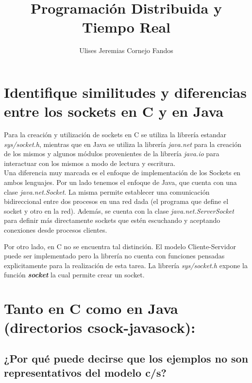 \documentclass[osajnl,twocolumn,showpacs,superscriptaddress,10pt]{revtex4-1} %
\begin{document}
\title{Programación Distribuida y Tiempo Real}

\author{Ulises Jeremias Cornejo Fandos}

\maketitle %

\section{Identifique similitudes y diferencias entre los sockets en C y en Java}

Para la creación y utilización de sockets en C se utiliza la librería estandar \textit{sys/socket.h}, mientras que en Java se utiliza la librería \textit{java.net} para la creación de los mismos y algunos módulos provenientes de la librería \textit{java.io} para interactuar con los mismos a modo de lectura y escritura. \\

Una diferencia muy marcada es el enfoque de implementación de los Sockets en ambos lenguajes. Por un lado tenemos el enfoque de Java, que cuenta con una clase \textit{java.net.Socket}. La misma permite establecer una comunicación bidireccional entre dos procesos en una red dada (el programa que define el socket y otro en la red). Además, se cuenta con la clase \textit{java.net.ServerSocket} para definir más directamente sockets que estén escuchando y aceptando conexiones desde procesos clientes.

Por otro lado, en C no se encuentra tal distinción. El modelo Cliente-Servidor puede ser implementado pero la librería no cuenta con funciones pensadas explicitamente para la realización de esta tarea. La librería \textit{sys/socket.h} expone la función \textbf{\textit{socket}} la cual permite crear un socket.

\section{Tanto en C como en Java (directorios csock-javasock):}

\subsection{¿Por qué puede decirse que los ejemplos no son representativos del modelo c/s?}
\end{document}
